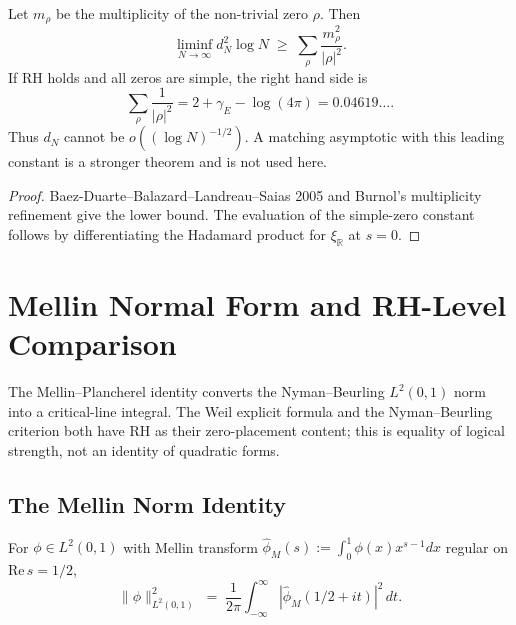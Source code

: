\begin{theorem}
\label{v4-arith:w7-b:thm:bdbls-rate}
Let \(m_{\rho}\) be the multiplicity of the
non-trivial zero \(\rho\). Then
\begin{equation}
\label{v4-arith:w7-b:eq:bdbls-rate}
\liminf_{N\to\infty} d_N^2\log N
\;\geq\;
\sum_{\rho}\frac{m_{\rho}^{2}}{|\rho|^{2}}.
\end{equation}
If RH holds and all zeros are simple, the right hand side is
\[
\sum_{\rho}\frac{1}{|\rho|^{2}}
=2+\gamma_{E}-\log(4\pi)=0.04619\ldots .
\]
Thus \(d_N\) cannot be \(o((\log N)^{-1/2})\).  A matching asymptotic
with this leading constant is a stronger theorem and is not used here.
\end{theorem}

\begin{proof}
Baez-Duarte--Balazard--Landreau--Saias 2005 and Burnol's multiplicity
refinement give the lower bound. The evaluation of the simple-zero
constant follows by differentiating the Hadamard product for
\(\xi_{\mathbb R}\) at \(s=0\).
\end{proof}

\section{Mellin Normal Form and RH-Level Comparison}
\label{v4-arith:w7-b:mellin-translation}

The Mellin--Plancherel identity converts the Nyman--Beurling
\(L^{2}(0,1)\) norm into a critical-line integral.  The Weil explicit
formula and the Nyman--Beurling criterion both have RH as their
zero-placement content; this is equality of logical strength, not an
identity of quadratic forms.

\subsection{The Mellin Norm Identity}
\label{v4-arith:w7-b:mellin-translation:norm}

\begin{lemma}
\label{v4-arith:w7-b:lem:mellin-plancherel}
For \(\phi\in L^{2}(0,1)\) with Mellin
transform \(\widehat{\phi}_{M}(s):=\int_{0}^{1}\phi(x)x^{s-1}dx\) regular
on \(\mathrm{Re}\,s=1/2\),
\begin{equation}
\label{v4-arith:w7-b:eq:mellin-plancherel}
\|\phi\|_{L^{2}(0,1)}^{2}\;=\;\frac{1}{2\pi}\int_{-\infty}^{\infty}|\widehat{\phi}_{M}(1/2+it)|^{2}\,dt.
\end{equation}
\end{lemma}

